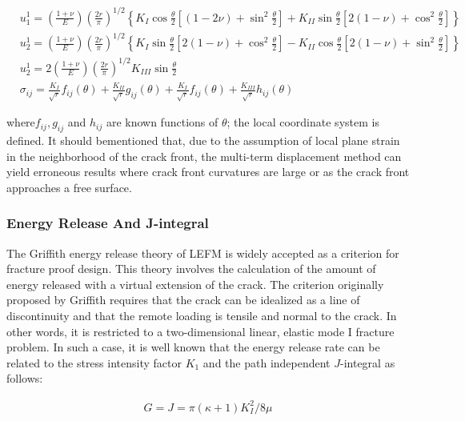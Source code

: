 \documentclass[11pt]{article}
\begin{document}
\begin{align*}
    &u_{1}^{1} = \left(\frac{1 + \nu}{E}\right)\left(\frac{2r}{\pi}\right) ^{1/2} \left\{K_I\cos\frac{\theta}{2}\left[(1-2\nu)+\sin ^ 2 \frac{\theta}{2}\right] + K_{II}\sin \frac{\theta}{2}\left[2(1 - \nu) + \cos ^ 2 \frac{\theta}{2}\right]\right\}\\
    &u_{2}^{1} = \left(\frac{1 + \nu}{E}\right)\left(\frac{2r}{\pi}\right) ^{1/2} \left\{K_I\sin\frac{\theta}{2}\left[2(1-\nu)+\cos ^ 2 \frac{\theta}{2}\right] - K_{II}\cos \frac{\theta}{2}\left[2(1 - \nu) + \sin ^ 2 \frac{\theta}{2}\right]\right\}
 \\ &u_{2}^{1} = 2\left(\frac{1 + \nu}{E}\right)\left(\frac{2r}{\pi}\right) ^{1/2} K_{III}\sin \frac{\theta}{2} \tag{15} \label{15}\
 \\&\sigma_{ij} = \frac{K_{I}}{\sqrt{r}}f_{ij}(\theta) + \frac{K_{II}}{\sqrt{r}}g_{ij}(\theta) + \frac{K_{I}}{\sqrt{r}}f_{ij}(\theta) + \frac{K_{III}}{\sqrt{r}}h_{ij}(\theta) \tag{16} \label{16}
\end{align*}


where$ f_{ij}, g_{ij}$ and $h_{ij}$ are known functions of $\theta$; the local coordinate system is defined.
It should bementioned that, due to the assumption of local plane strain in the neighborhood of the crack front,
the multi-term displacement method can yield erroneous results where crack front curvatures are
large or as the crack front approaches a free surface.

\subsubsection{Energy Release And J-integral}

The Griffith energy release theory of LEFM is widely accepted as a criterion for fracture proof
design. This theory involves the calculation of the amount of energy released with a virtual
extension of the crack. The criterion originally proposed by Griffith requires that the crack can
be idealized as a line of discontinuity and that the remote loading is tensile and normal to the crack.
In other words, it is restricted to a two-dimensional linear, elastic mode I fracture problem. In such
a case, it is well known that the energy release rate can be related to the stress intensity factor $K_1$
and the path independent $J$-integral as follows:

\begin{align*}
    G = J = \pi (\kappa + 1 ) K_{I}^{2}/ 8 \mu \tag{17} \label{17}
\end{align*}
\end{document}
